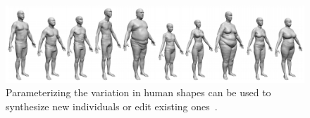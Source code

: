 \begin{figure}[t]
\centering
    \includegraphics[width=1.0\columnwidth]{fig/img/allen_sig03_human.pdf}
    \caption{Parameterizing the variation in human shapes can be used to synthesize new individuals or edit existing ones~\cite{Allen:2003:SHB}.}
    \label{fig:allen_sig03_human}
\end{figure}


